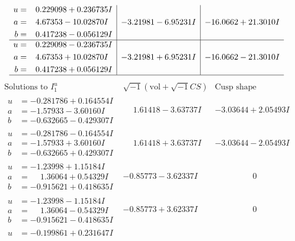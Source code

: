 \documentclass[1p]{elsarticle_modified}
\theoremstyle{definition}
\newcommand{\I}{\sqrt{-1}}
\begin{document}
$$\begin{array}{c|c|c}
\begin{aligned}
u &= \phantom{-}0.229098 + 0.236735 I \\
a &= \phantom{-}4.67353 - 10.02870 I \\
b &= \phantom{-}0.417238 - 0.056129 I\end{aligned}
 & -3.21981 - 6.95231 I & -16.0662 + 21.3010 I \\ \hline\begin{aligned}
u &= \phantom{-}0.229098 - 0.236735 I \\
a &= \phantom{-}4.67353 + 10.02870 I \\
b &= \phantom{-}0.417238 + 0.056129 I\end{aligned}
 & -3.21981 + 6.95231 I & -16.0662 - 21.3010 I\\
 \hline 
 \end{array}$$\newpage$$\begin{array}{c|c|c}  
\text{Solutions to }I^u_{1}& \I (\text{vol} + \sqrt{-1}CS) & \text{Cusp shape}\\
 \hline 
\begin{aligned}
u &= -0.281786 + 0.164554 I \\
a &= -1.57933 - 3.60160 I \\
b &= -0.632665 - 0.429307 I\end{aligned}
 & \phantom{-}1.61418 - 3.63737 I & -3.03644 + 2.05493 I \\ \hline\begin{aligned}
u &= -0.281786 - 0.164554 I \\
a &= -1.57933 + 3.60160 I \\
b &= -0.632665 + 0.429307 I\end{aligned}
 & \phantom{-}1.61418 + 3.63737 I & -3.03644 - 2.05493 I \\ \hline\begin{aligned}
u &= -1.23998 + 1.15184 I \\
a &= \phantom{-}1.36064 + 0.54329 I \\
b &= -0.915621 + 0.418635 I\end{aligned}
 & -0.85773 - 3.62337 I & \phantom{-0.000000 } 0 \\ \hline\begin{aligned}
u &= -1.23998 - 1.15184 I \\
a &= \phantom{-}1.36064 - 0.54329 I \\
b &= -0.915621 - 0.418635 I\end{aligned}
 & -0.85773 + 3.62337 I & \phantom{-0.000000 } 0 \\ \hline\begin{aligned}
u &= -0.199861 + 0.231647 I \\

\end{aligned}
\end{array}$$
\end{document}
